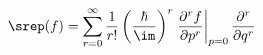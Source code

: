 \begin{equation}
    \label{eq:srep}
    \srep(f) = \sum_{r=0}^\infty \frac{1}{r!}
    \left(\frac{\hbar}{\im}\right)^r 
    \left.\frac{\partial^r f}{\partial p^r} \right|_{p=0}
    \frac{\partial^r}{\partial q^r}
\end{equation}

